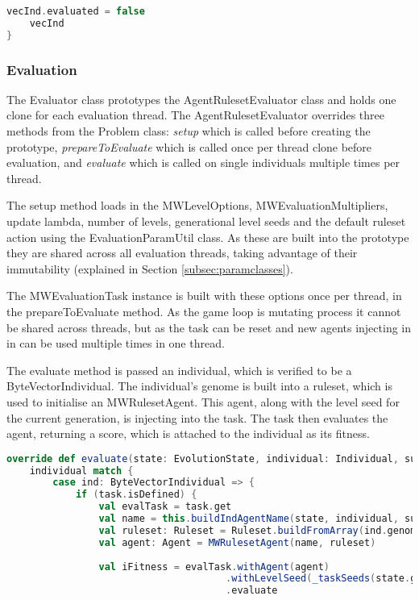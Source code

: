 \begin{minipage}{0.9\linewidth}
\centering
\begin{lstlisting}[language=scala]
    vecInd.evaluated = false
    vecInd
}
\end{lstlisting}
\end{minipage}

\subsubsection{Evaluation}

The Evaluator class prototypes the AgentRulesetEvaluator class and holds one clone for each evaluation thread. The AgentRulesetEvaluator overrides three methods from the Problem class: \emph{setup} which is called before creating the prototype, \emph{prepareToEvaluate} which is called once per thread clone before evaluation, and \emph{evaluate} which is called on single individuals multiple times per thread.

The setup method loads in the MWLevelOptions, MWEvaluationMultipliers, update lambda, number of levels, generational level seeds and the default ruleset action using the EvaluationParamUtil class. As these are built into the prototype they are shared across all evaluation threads, taking advantage of their immutability (explained in Section \ref{subsec:paramclasses}). 

The MWEvaluationTask instance is built with these options once per thread, in the prepareToEvaluate method. As the game loop is mutating process it cannot be shared across threads, but as the task can be reset and new agents injecting in in can be used multiple times in one thread.

The evaluate method is passed an individual, which is verified to be a ByteVectorIndividual. The individual's genome is built into a ruleset, which is used to initialise an MWRulesetAgent. This agent, along with the level seed for the current generation, is injecting into the task. The task then evaluates the agent, returning a score, which is attached to the individual as its fitness.


\begin{minipage}{0.9\linewidth}
\centering
\begin{lstlisting}[language=scala]
override def evaluate(state: EvolutionState, individual: Individual, subpop: Int, thread: Int): Unit = {
    individual match {
        case ind: ByteVectorIndividual => {
            if (task.isDefined) {
                val evalTask = task.get
                val name = this.buildIndAgentName(state, individual, subpop, thread)
                val ruleset: Ruleset = Ruleset.buildFromArray(ind.genome, defaultAction)
                val agent: Agent = MWRulesetAgent(name, ruleset)
            
                val iFitness = evalTask.withAgent(agent)
                                      .withLevelSeed(_taskSeeds(state.generation))
                                      .evaluate
\end{lstlisting}
\end{minipage}

